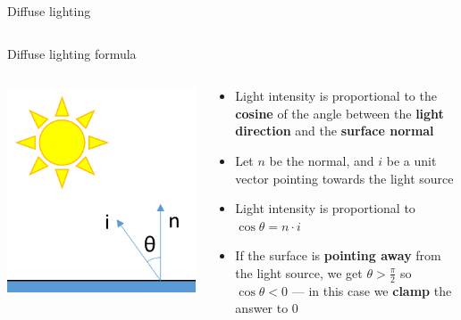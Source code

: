 \begin{frame}{Diffuse lighting}
\begin{columns}
\begin{column}{0.33\textwidth}
		\end{column}
	\end{columns}
\end{frame}

\begin{frame}{Diffuse lighting formula}
	\begin{columns}
		\begin{column}{0.25\textwidth}
			\includegraphics[width=\textwidth]{diffuse_angle}
		\end{column}
		\begin{column}{0.73\textwidth}
			\begin{itemize}
				\pause\item Light intensity is proportional to the \textbf{cosine} of the angle between the \textbf{light direction} and the \textbf{surface normal}
				\pause\item Let $n$ be the normal, and $i$ be a unit vector pointing towards the light source
				\pause\item Light intensity is proportional to
					$\cos \theta = n \cdot i$
				\pause\item If the surface is \textbf{pointing away} from the light source, we get $\theta > \frac{\pi}{2}$ so $\cos \theta < 0$ ---
					in this case we \textbf{clamp} the answer to $0$
			\end{itemize}
		\end{column}
	\end{columns}
\end{frame}

